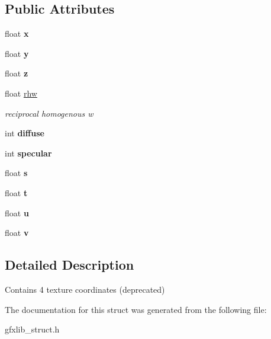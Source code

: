 \subsection*{Public Attributes}
\begin{DoxyCompactItemize}
\item 
float {\bfseries x}\hypertarget{structGFXTVertex_a5fd2c06ba232a3b481ac4f7a2230398b}{}\label{structGFXTVertex_a5fd2c06ba232a3b481ac4f7a2230398b}

\item 
float {\bfseries y}\hypertarget{structGFXTVertex_aedc990138c8c95922a1bd041306f6fc2}{}\label{structGFXTVertex_aedc990138c8c95922a1bd041306f6fc2}

\item 
float {\bfseries z}\hypertarget{structGFXTVertex_a5df4a132d4e9ae704b85459e1e9ab06d}{}\label{structGFXTVertex_a5df4a132d4e9ae704b85459e1e9ab06d}

\item 
float \hyperlink{structGFXTVertex_a2c23429d105eba83aca495f10693de5a}{rhw}\hypertarget{structGFXTVertex_a2c23429d105eba83aca495f10693de5a}{}\label{structGFXTVertex_a2c23429d105eba83aca495f10693de5a}

\begin{DoxyCompactList}\small\item\em reciprocal homogenous w \end{DoxyCompactList}\item 
int {\bfseries diffuse}\hypertarget{structGFXTVertex_ae4b01978aa859dadd86bf312124bae5f}{}\label{structGFXTVertex_ae4b01978aa859dadd86bf312124bae5f}

\item 
int {\bfseries specular}\hypertarget{structGFXTVertex_a2763018c83c5f8c497e3f2d9e4b8394d}{}\label{structGFXTVertex_a2763018c83c5f8c497e3f2d9e4b8394d}

\item 
float {\bfseries s}\hypertarget{structGFXTVertex_a9c9cbe03bf456db1f6496435f3bc720d}{}\label{structGFXTVertex_a9c9cbe03bf456db1f6496435f3bc720d}

\item 
float {\bfseries t}\hypertarget{structGFXTVertex_adbad8c1a74aa66516c421fa43e94cccc}{}\label{structGFXTVertex_adbad8c1a74aa66516c421fa43e94cccc}

\item 
float {\bfseries u}\hypertarget{structGFXTVertex_a685529feb8301ac774d28c56bbd9ca88}{}\label{structGFXTVertex_a685529feb8301ac774d28c56bbd9ca88}

\item 
float {\bfseries v}\hypertarget{structGFXTVertex_a8bf42ca4e51b50518abfef2a140bdf0b}{}\label{structGFXTVertex_a8bf42ca4e51b50518abfef2a140bdf0b}

\end{DoxyCompactItemize}


\subsection{Detailed Description}
Contains 4 texture coordinates (deprecated) 

The documentation for this struct was generated from the following file\+:\begin{DoxyCompactItemize}
\item 
gfxlib\+\_\+struct.\+h\end{DoxyCompactItemize}
